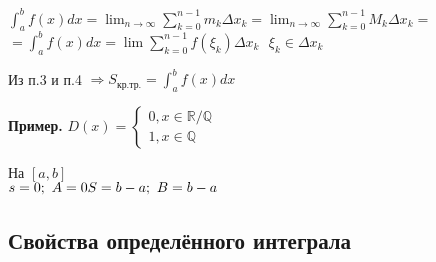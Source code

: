 \documentclass{article}
\begin{document}
\( \int_a^b f(x)dx = \lim_{n \to \infty} \sum_{k=0}^{n-1}m_k \Delta x_k = \lim_{n\to\infty} \sum_{k=0}^{n-1}M_k\Delta x_k = \)
\(= \int_a^b f(x)dx = \lim \sum_{k = 0}^{n-1} f(\xi_k)\Delta x_k \ \ \ \xi_k \in \Delta x_k \)

Из п.3 и п.4 \(\Rightarrow S_{\textrm{кр.тр.}} = \int_a^b f(x)dx\)

\textbf{Пример.} \(D(x) = \begin{cases}
    0, x \in \mathbb{R}/\mathbb{Q}\\
    1, x \in \mathbb{Q}
\end{cases}\)

На $[a, b]$ \\
\(s = 0;\ A = {0} \\ S = b - a;\ B = {b - a}\)


\subsection{Свойства определённого интеграла}
\end{document}
